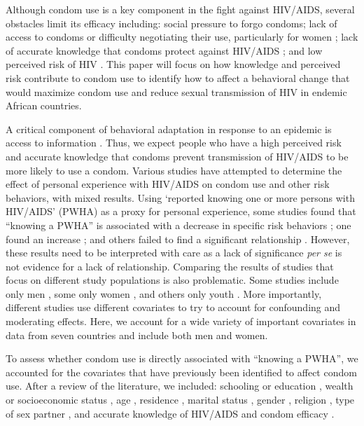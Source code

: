 \documentclass[10pt,letterpaper]{article}
\begin{document}
Although condom use is a key component in the fight against HIV/AIDS, several obstacles limit its efficacy including: social pressure to forgo condoms; lack of access to condoms or difficulty negotiating their use, particularly for women \cite{ChimMcGr10, MacPTerr09, BassMhlo91, PettMeas04}; lack of accurate knowledge that condoms protect against HIV/AIDS \cite{KayiFors11}; and low perceived risk of HIV \cite{AdihAlex99, MeekSilv06}. This paper will focus on how knowledge and perceived risk contribute to condom use to identify how to affect a behavioral change that would maximize condom use and reduce sexual transmission of HIV in endemic African countries.


A critical component of behavioral adaptation in response to an epidemic is access to information \cite{Funk_2010, FunkGila09}. Thus, we expect people who have a high perceived risk and accurate knowledge that condoms prevent transmission of HIV/AIDS to be more likely to use a condom. Various studies have attempted to determine the effect of personal experience with HIV/AIDS on condom use and other risk behaviors, with mixed results. Using `reported knowing one or more persons with HIV/AIDS' (PWHA) as a proxy for personal experience, some studies found that ``knowing a PWHA'' is associated with a decrease in specific risk behaviors  \cite{GregZhuw98,IjumGami04, MaciBrow01}; one found an increase  \cite{PalePett08}; and others failed to find a significant relationship \cite{KayiFors11, CamlChim03, Zell03, Katz06}. However, these results need to be interpreted with care as a lack of significance \emph{per se} is not evidence for a lack of relationship. Comparing the results of studies that focus on different study populations is also problematic. Some studies include only men \cite{MaciBrow01}, some only women \cite{CamlChim03}, and others only youth \cite{ChimMcGr10, KayiFors11, Katz06, PalePett08}. More importantly, different studies use different covariates to try to account for confounding and moderating effects. Here, we account for a wide variety of important covariates in data from seven countries and include both men and women. 

To assess whether condom use is directly associated with ``knowing a PWHA'', we accounted for the covariates that have previously been identified to affect condom use. After a review of the literature, we included:
schooling or education \cite{MaciBrow01, CamlChim03, Katz06, OyedFeyi11, UchuMaga12},
wealth or socioeconomic status \cite{MeekSilv06, ChimMcGr10, OyedFeyi11},
age \cite{AdihAlex99, CamlChim03, Zell03, MeekSilv06, ChimMcGr10,  OyedFeyi11, UchuMaga12},
residence \cite{CamlChim03, OyedFeyi11, UchuMaga12},
marital status \cite{MaciBrow01, UchuMaga12},
gender \cite{MaciBrow01, ChimMcGr10},
religion \cite{MaciBrow01, OyedFeyi11, UchuMaga12},
type of sex partner \cite{CamlChim03, ChimMcGr10},
and accurate knowledge of HIV/AIDS and condom efficacy \cite{AdihAlex99, CamlChim03, Katz06,KayiFors11, LiddGile08}.
\end{document}
